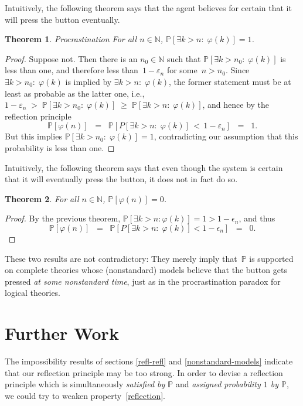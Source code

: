 \documentclass[12pt]{article}
\newcommand{\PP}{\mathbb{P}}
\newcommand{\vp}{\varphi}
\newcommand{\NN}{\mathbb{N}}
\theoremstyle{plain}
\newtheorem{theorem}{Theorem}[subsection]
\theoremstyle{definition}
\theoremstyle{remark}
\begin{document}
Intuitively, the following theorem says that the agent believes for certain that it will press the button eventually.
\begin{theorem} \emph{Procrastination}
For all $n\in\NN$, $\PP[\exists k>n{:}\;\vp(k)] = 1$.
\end{theorem}
\begin{proof}
Suppose not. Then there is an $n_0\in\NN$ such that $\PP[\exists k>n_0{:}\;\vp(k)]$ is less than one, and therefore less than~$1 - \varepsilon_n$ for some~$n>n_0$. Since $\exists k>n_0{:}\;\vp(k)$ is implied by $\exists k>n{:}\; \vp(k)$, the former statement must be at least as probable as the latter one, i.e., $1 - \varepsilon_n \;>\; \PP[\exists k>n_0{:}\; \vp(k)] \;\ge\; \PP[\exists k>n{:}\;\vp(k)]$, and hence by the reflection principle
\[
\PP[\vp(n)] \;\;=\;\; \PP[P[\exists k>n{:}\;\vp(k)] \,<\, 1 - \varepsilon_n] \;\;=\;\; 1.
\]
But this implies $\PP[\exists k>n_0{:}\;\vp(k)] = 1$, contradicting our assumption that this probability is less than one.
\end{proof}
Intuitively, the following theorem says that even though the system is certain that it will eventually press the button, it does not in fact do so.
\begin{theorem}
For all $n\in\NN$, $\PP[\vp(n)] = 0$.
\end{theorem}
\begin{proof}
By the previous theorem, $\PP[\exists k>n:\vp(k)] = 1 > 1 - \epsilon_n$, and thus
\[
\PP[\vp(n)] \;\;=\;\; \PP[P[\exists k>n{:}\;\vp(k)] < 1 - \epsilon_n] \;\;=\;\; 0.
\]
\end{proof}
These two results are not contradictory: They merely imply that~$\PP$ is supported on complete theories whose (nonstandard) models believe that the button gets pressed \emph{at some nonstandard time}, just as in the procrastination paradox for logical theories.
\section{Further Work}
\label{further-work}

The impossibility results of sections \ref{refl-refl} and \ref{nonstandard-models} indicate that our reflection principle may be too strong.
In order to devise a reflection principle which is simultaneously \emph{satisfied by $\PP$}
and \emph{assigned probability $1$ by $\PP$},
we could try to weaken property~\ref{reflection}.
\end{document}
